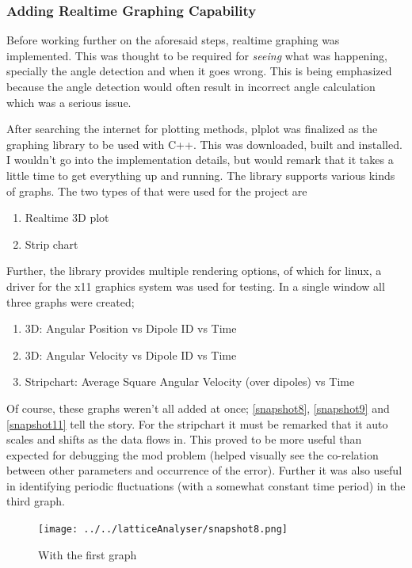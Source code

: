 		\subsubsection{Adding Realtime Graphing Capability}
			Before working further on the aforesaid steps, realtime graphing was implemented. This was thought to be required for \emph{seeing} what was happening, specially the angle detection and when it goes wrong. This is being emphasized because the angle detection would often result in incorrect angle calculation which was a serious issue.
			\par
			After searching the internet for plotting methods, plplot was finalized as the graphing library to be used with C++. This was downloaded, built and installed. I wouldn't go into the implementation details, but would remark that it takes a little time to get everything up and running. The library supports various kinds of graphs. The two types of that were used for the project are
			\begin{enumerate}
				\item Realtime 3D plot
				\item Strip chart
			\end{enumerate}
			Further, the library provides multiple rendering options, of which for linux, a driver for the x11 graphics system was used for testing. In a single window all three graphs were created;
			\begin{enumerate}
				\item 3D: Angular Position vs Dipole ID vs Time
				\item 3D: Angular Velocity vs Dipole ID vs Time
				\item Stripchart: Average Square Angular Velocity (over dipoles) vs Time
			\end{enumerate}
			Of course, these graphs weren't all added at once; \autoref{snapshot8}, \autoref{snapshot9} and \autoref{snapshot11} tell the story. For the stripchart it must be remarked that it auto scales and shifts as the data flows in. This proved to be more useful than expected for debugging the mod problem (helped visually see the co-relation between other parameters and occurrence of the error). Further it was also useful in identifying periodic fluctuations (with a somewhat constant time period) in the third graph.
			\begin{figure}[bth]
				\begin{center}
					\texttt{[image: ../../latticeAnalyser/snapshot8.png]}
				\end{center}
			\caption[With the first graph]{With the first graph}
			\label{snapshot8}
			\end{figure}

